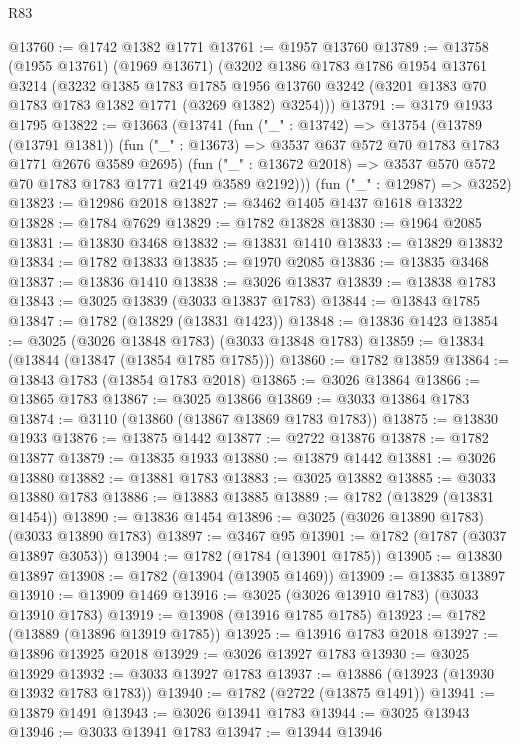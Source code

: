 \begin{lexlean}{R83}
\begin{coremodule}
@13760 := @1742 @1382 @1771
@13761 := @1957 @13760
@13789 := @13758
    (@1955 @13761)
    (@1969 @13671)
    (@3202
      @1386
      @1783
      @1786
      @1954
      @13761
      @3214
      (@3232
        @1385
        @1783
        @1785
        @1956
        @13760
        @3242
        (@3201 @1383 @70 @1783 @1783 @1382 @1771 (@3269 @1382) @3254)))
@13791 := @3179 @1933 @1795
@13822 := @13663
    (@13741
      (fun ("_" : @13742) =>
      @13754
        (@13789 (@13791 @1381))
        (fun ("_" : @13673) => @3537 @637 @572 @70 @1783 @1783 @1771 @2676 @3589 @2695)
        (fun ("_" : @13672 @2018) => @3537 @570 @572 @70 @1783 @1783 @1771 @2149 @3589 @2192)))
    (fun ("_" : @12987) => @3252)
@13823 := @12986 @2018
@13827 := @3462 @1405 @1437 @1618 @13322
@13828 := @1784 @7629
@13829 := @1782 @13828
@13830 := @1964 @2085
@13831 := @13830 @3468
@13832 := @13831 @1410
@13833 := @13829 @13832
@13834 := @1782 @13833
@13835 := @1970 @2085
@13836 := @13835 @3468
@13837 := @13836 @1410
@13838 := @3026 @13837
@13839 := @13838 @1783
@13843 := @3025 @13839 (@3033 @13837 @1783)
@13844 := @13843 @1785
@13847 := @1782 (@13829 (@13831 @1423))
@13848 := @13836 @1423
@13854 := @3025 (@3026 @13848 @1783) (@3033 @13848 @1783)
@13859 := @13834 (@13844 (@13847 (@13854 @1785 @1785)))
@13860 := @1782 @13859
@13864 := @13843 @1783 (@13854 @1783 @2018)
@13865 := @3026 @13864
@13866 := @13865 @1783
@13867 := @3025 @13866
@13869 := @3033 @13864 @1783
@13874 := @3110 (@13860 (@13867 @13869 @1783 @1783))
@13875 := @13830 @1933
@13876 := @13875 @1442
@13877 := @2722 @13876
@13878 := @1782 @13877
@13879 := @13835 @1933
@13880 := @13879 @1442
@13881 := @3026 @13880
@13882 := @13881 @1783
@13883 := @3025 @13882
@13885 := @3033 @13880 @1783
@13886 := @13883 @13885
@13889 := @1782 (@13829 (@13831 @1454))
@13890 := @13836 @1454
@13896 := @3025 (@3026 @13890 @1783) (@3033 @13890 @1783)
@13897 := @3467 @95
@13901 := @1782 (@1787 (@3037 @13897 @3053))
@13904 := @1782 (@1784 (@13901 @1785))
@13905 := @13830 @13897
@13908 := @1782 (@13904 (@13905 @1469))
@13909 := @13835 @13897
@13910 := @13909 @1469
@13916 := @3025 (@3026 @13910 @1783) (@3033 @13910 @1783)
@13919 := @13908 (@13916 @1785 @1785)
@13923 := @1782 (@13889 (@13896 @13919 @1785))
@13925 := @13916 @1783 @2018
@13927 := @13896 @13925 @2018
@13929 := @3026 @13927 @1783
@13930 := @3025 @13929
@13932 := @3033 @13927 @1783
@13937 := @13886 (@13923 (@13930 @13932 @1783 @1783))
@13940 := @1782 (@2722 (@13875 @1491))
@13941 := @13879 @1491
@13943 := @3026 @13941 @1783
@13944 := @3025 @13943
@13946 := @3033 @13941 @1783
@13947 := @13944 @13946

\end{coremodule}
\end{lexlean}
